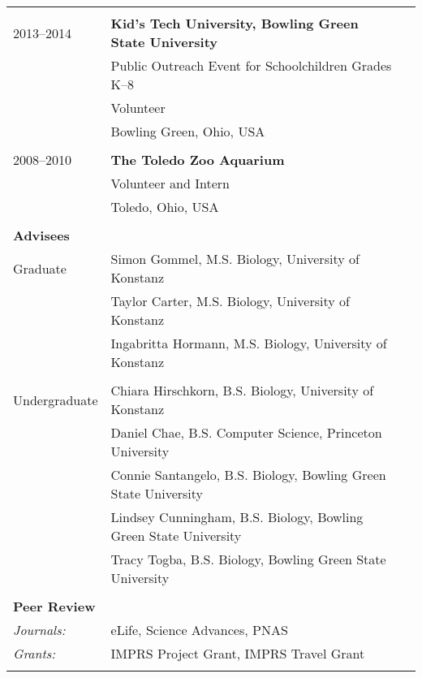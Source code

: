\documentclass[letterpaper,7pt,oneside]{article}
\begin{document}
\begin{small}
\begin{longtable}{@{} l p{5.3in}l}
& \\
\large{2013–2014}
& \textbf{Kid's Tech University, Bowling Green State University} \\
& Public Outreach Event for Schoolchildren Grades K–8 \\
& Volunteer \\
& Bowling Green, Ohio, USA \\
& \\
\large{2008–2010}
& \textbf{The Toledo Zoo Aquarium} \\
& Volunteer and Intern \\
& Toledo, Ohio, USA \\
& \\

 \Large{\textbf{Advisees}}  \vspace{5mm} \\
 \large{Graduate} 
  & Simon Gommel, M.S. Biology, University of Konstanz \\
 & Taylor Carter, M.S. Biology, University of Konstanz \\
 & Ingabritta Hormann, M.S. Biology, University of Konstanz \\

 & \\
 \large{Undergraduate}
  & Chiara Hirschkorn, B.S. Biology, University of Konstanz \\
  & Daniel Chae, B.S. Computer Science, Princeton University \\
 &  Connie Santangelo, B.S. Biology, Bowling Green State University \\
 & Lindsey Cunningham, B.S. Biology, Bowling Green State University \\
 & Tracy Togba, B.S. Biology, Bowling Green State University \\
& \\

 \Large{\textbf{Peer Review}}  \vspace{5mm} \\
 \normalsize{\textit{Journals: }} & eLife, Science Advances, PNAS \vspace{1mm} \\
 \normalsize{\textit{Grants: }} & IMPRS Project Grant, IMPRS Travel Grant \vspace{1mm} \\
 & \\


\end{longtable}
\end{small}
\end{document}
